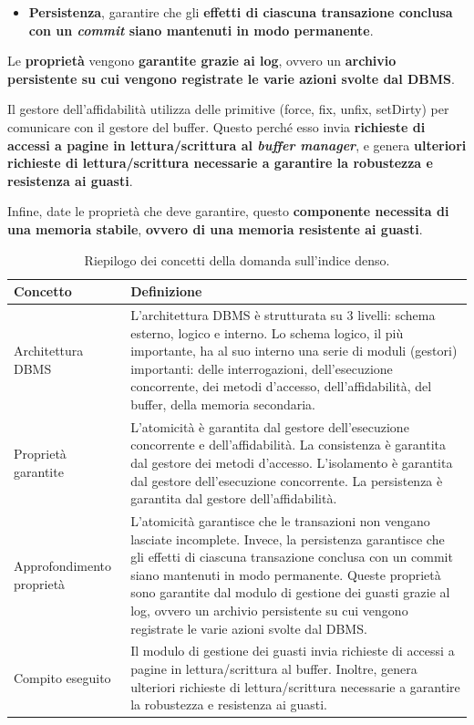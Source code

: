 \documentclass[a4paper]{article}
\begin{document}
\begin{enumerate}
\begin{itemize}
			\item \textbf{Persistenza}, garantire che gli \textbf{effetti di ciascuna transazione conclusa con un \emph{commit} siano mantenuti in modo permanente}.
		\end{itemize}
		Le \textbf{proprietà} vengono \textbf{garantite grazie ai log}, ovvero un \textbf{archivio persistente su cui vengono registrate le varie azioni svolte dal DBMS}.
		
		Il gestore dell'affidabilità utilizza delle primitive (\textsf{force, fix, unfix, setDirty}) per comunicare con il gestore del buffer. Questo perché esso invia \textbf{richieste di accessi a pagine in lettura/scrittura al \emph{buffer manager}}, e genera \textbf{ulteriori richieste di lettura/scrittura necessarie a garantire la robustezza e resistenza ai guasti}.
		
		Infine, date le proprietà che deve garantire, questo \textbf{componente necessita di una memoria stabile}, \textbf{ovvero di una memoria resistente ai guasti}.
		
		\begin{table}[!htp]
			\centering
			\begin{tabular}{@{} l p{23em} @{}}
				\toprule
				Concetto & Definizione \\
				\midrule
				Architettura DBMS & L'architettura DBMS è strutturata su 3 livelli: schema esterno, logico e interno. Lo schema logico, il più importante, ha al suo interno una serie di moduli (gestori) importanti: delle interrogazioni, dell'esecuzione concorrente, dei metodi d'accesso, dell'affidabilità, del buffer, della memoria secondaria. \\ [0.5em]
				Proprietà garantite & L'atomicità è garantita dal gestore dell'esecuzione concorrente e dell'affidabilità.\newline
				La consistenza è garantita dal gestore dei metodi d'accesso.\newline
				L'isolamento è garantita dal gestore dell'esecuzione concorrente.\newline
				La persistenza è garantita dal gestore dell'affidabilità. \\ [0.5em]
				Approfondimento proprietà & L'atomicità garantisce che le transazioni non vengano lasciate incomplete. Invece, la persistenza garantisce che gli effetti di ciascuna transazione conclusa con un commit siano mantenuti in modo permanente. Queste proprietà sono garantite dal modulo di gestione dei guasti grazie al log, ovvero un archivio persistente su cui vengono registrate le varie azioni svolte dal DBMS. \\ [.5em]
				Compito eseguito & Il modulo di gestione dei guasti invia richieste di accessi a pagine in lettura/scrittura al buffer. Inoltre, genera ulteriori richieste di lettura/scrittura necessarie a garantire la robustezza e resistenza ai guasti. \\
				\bottomrule
			\end{tabular}
			\caption{Riepilogo dei concetti della domanda sull'indice denso.}
		\end{table}\newpage
		

\end{enumerate}
\end{document}
